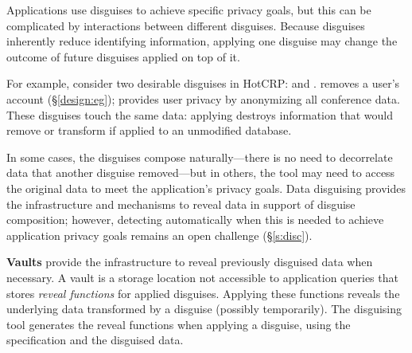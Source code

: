 Applications use disguises to achieve specific privacy goals, but this can be
complicated by interactions between different disguises.
%
Because disguises inherently reduce identifying information,
applying one disguise may change the outcome of future disguises applied on top of it.
%

%
For example, consider two desirable disguises in HotCRP: \gdpr and \ca.
%
\gdpr removes a user's account (\S\ref{design:eg}); \ca provides user privacy by
anonymizing all conference data.
%
These disguises touch the same data: applying \ca destroys information that \gdpr would
remove or transform if applied to an unmodified database.
%

%
In some cases, the disguises compose naturally---\eg there is no need to decorrelate
data that another disguise removed---but in others, the tool may need to access the
original data to meet the application's privacy goals.
%
%
Data disguising provides the infrastructure and mechanisms to reveal data in support
of disguise composition; however, detecting automatically when this is needed to
achieve application privacy goals remains an open challenge (\S\ref{s:disc}).


%
\textbf{Vaults} provide the infrastructure to reveal previously disguised data
when necessary.
%
A vault is a storage location not accessible to application queries that stores
\emph{reveal functions} for applied disguises.
%
Applying these functions reveals the underlying data transformed by a disguise
(possibly temporarily).
%
The disguising tool generates the reveal functions when applying a disguise, using
the specification and the disguised data.
%

